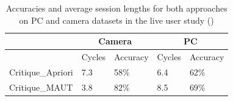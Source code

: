 
\begin{table}[h]
\renewcommand{\arraystretch}{1.4}
\centering
\begin{tabular}{|p{5cm}|l|l|l|l|}
\hline
                  & \multicolumn{2}{c|}{Camera} & \multicolumn{2}{c|}{PC} \\ \hline
                  & Cycles      & Accuracy      & Cycles    & Accuracy    \\ \hline
Critique\_Apriori & 7.3         & 58\%          & 6.4       & 62\%        \\ \hline
Critique\_MAUT    & 3.8         & 82\%          & 8.5       & 69\%        \\ \hline
\end{tabular}
 \caption{Accuracies and average session lengths for both approaches on PC and camera datasets in the live user study (\cite{liveUserStudy})}
 \label{tab:liveUserStudies}
\end{table}


